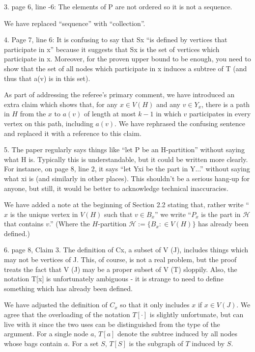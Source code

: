 \documentclass[12pt]{article}
\newenvironment{response}{\color{blue}}{}
\begin{document}
3. page 6, line -6: The elements of P are not ordered so it is not a sequence.

\begin{response}
  We have replaced ``sequence'' with ``collection''.
\end{response}

4. Page 7, line 6: It is confusing to say that Sx “is defined by vertices
that participate in x” because it suggests that Sx is the set of vertices
which participate in x. Moreover, for the proven upper bound to be
enough, you need to show that the set of all nodes which participate in
x induces a subtree of T (and thus that a(v) is in this set).

\begin{response}
  As part of addressing the referee's primary comment, we have introduced an extra claim which shows that, for any $x\in V(H)$ and any $v\in Y_x$, there is a path in $H$ from the $x$ to $a(v)$ of length at most $k-1$ in which $v$ participates in every vertex on this path, including $a(v)$.  We have rephrased the confusing sentence and replaced it with a reference to this claim.
\end{response}


5. The paper regularly says things like “let P be an H-partition” without
saying what H is. Typically this is understandable, but it could be
written more clearly. For instance, on page 8, line 2, it says “let Yxi
be the part in Y...” without saying what xi
is (and similarly in other
places). This shouldn’t be a serious hang-up for anyone, but still, it
would be better to acknowledge technical inaccuracies.

\begin{response}
  We have added a note at the beginning of Section 2.2 stating that, rather write ``$x$ is the unique vertex in $V(H)$ such that $v\in B_x$'' we write
  ``$P_x$ is the part in $\mathcal{H}$ that contains $v$.''  (Where the $H$-partition $\mathcal{H}:=\{B_x:\in V(H)\}$ has already been defined.)
\end{response}

6. page 8, Claim 3. The definition of Cx, a subset of V (J), includes things
which may not be vertices of J. This, of course, is not a real problem,
but the proof treats the fact that V (J) may be a proper subset of
V (T) sloppily. Also, the notation T[x] is unfortunately ambiguous - it
is strange to need to define something which has already been defined.

\begin{response}
  We have adjusted the definition of $C_x$ so that it only includes $x$ if $x\in V(J)$.  We agree that the overloading of the notation $T[\cdot]$ is slightly unfortunate, but can live with it since the two uses can be distinguished from the type of the argument.  For a single node $a$, $T[a]$ denote the subtree induced by all nodes whose bags contain $a$. For a set $S$, $T[S]$ is the subgraph of $T$ induced by $S$.
\end{response}
\end{document}

